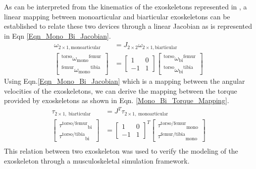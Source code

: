 \documentclass[10pt,letterpaper]{article}
\begin{document}
As can be interpreted from the kinematics of the exoskeletons represented in , a linear mapping between monoarticular and biarticular exoskeletons can be established to relate these two devices through a linear Jacobian as is represented in Eqn \eqref{Eqn_Mono_Bi_Jacobian}.
\begin{equation}\label{Eqn_Mono_Bi_Jacobian}
\begin{aligned}
\omega_{2\times 1, \mathrm{monoarticular}} &= J_{2\times 2}\omega_{2\times 1, \mathrm{biarticular}}\\
\left\lbrack \begin{array}{c}
{}^{\mathrm{torso}} {\omega_{\mathrm{mono}} }^{\mathrm{femur}} \\
{}^{\mathrm{femur}} {\omega_{\mathrm{mono}} }^{\mathrm{tibia}} 
\end{array}\right\rbrack &=\left\lbrack \begin{array}{cc}
1 & 0\\
-1 & 1
\end{array}\right\rbrack \left\lbrack \begin{array}{c}
{}^{\mathrm{torso}} {\omega_{\mathrm{bi}} }^{\mathrm{femur}} \\
{}^{\mathrm{torso}} {\omega_{\mathrm{bi}} }^{\mathrm{tibia}} 
\end{array}\right\rbrack
\end{aligned}
\end{equation}
Using Eqn.\eqref{Eqn_Mono_Bi_Jacobian} which is a mapping between the angular velocities of the exoskeletons, we can derive the mapping between the torque provided by exoskeletons as shown in Eqn. \eqref{Mono_Bi_Torque_Mapping}.
\begin{equation}\label{Mono_Bi_Torque_Mapping}
\begin{aligned}
\tau_{2\times 1,\;\mathrm{biarticular}} &=J^T \tau_{2\times 1,\;\mathrm{monoarticular}}\\
\left\lbrack \begin{array}{c}
{\tau^{\mathrm{torso}/\mathrm{femur}} }_{\mathrm{bi}} \\
{\tau^{\mathrm{torso}/\mathrm{tibia}} }_{\mathrm{bi}} 
\end{array}\right\rbrack &={\left\lbrack \begin{array}{cc}
	1 & 0\\
	-1 & 1
	\end{array}\right\rbrack }^T \left\lbrack \begin{array}{c}
{\tau^{\mathrm{torso}/\mathrm{femur}} }_{\mathrm{mono}} \\
{\tau^{\mathrm{femur}/\mathrm{tibia}} }_{\mathrm{mono}} 
\end{array}\right\rbrack\\
\end{aligned}
\end{equation}
This relation between two exoskeleton was used to verify the modeling of the exoskeleton through a musculoskeletal simulation framework.
\end{document}
